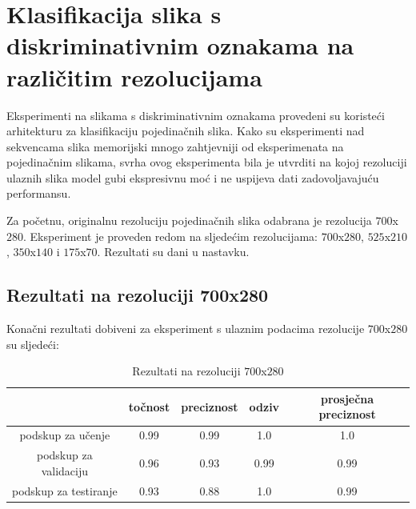 \documentclass[times, utf8, diplomski, numeric]{fer}
\begin{document}
\section{Klasifikacija slika s diskriminativnim oznakama na različitim rezolucijama}
Eksperimenti na slikama s diskriminativnim oznakama provedeni su koristeći arhitekturu za klasifikaciju pojedinačnih slika. 
Kako su eksperimenti nad sekvencama slika memorijski mnogo zahtjevniji od eksperimenata na pojedinačnim slikama, svrha ovog eksperimenta bila je utvrditi
na kojoj rezoluciji ulaznih slika model gubi ekspresivnu moć i ne uspijeva dati zadovoljavajuću performansu.

Za početnu, originalnu rezoluciju pojedinačnih slika odabrana je rezolucija $700$x$280$. Eksperiment je proveden redom na sljedećim rezolucijama:
$700$x$280$, $525$x$210$, $350$x$140$ i $175$x$70$. Rezultati su dani u nastavku.

\subsection{Rezultati na rezoluciji 700x280}
Konačni rezultati dobiveni za eksperiment s ulaznim podacima rezolucije $700$x$280$ su sljedeći:
\begin{table}[H]
\centering
\caption{Rezultati na rezoluciji $700$x$280$}
\label{score:single_hand_700x280}
\begin{tabular}{c|c|c|c|c|}
\cline{2-5}
                                            & točnost & preciznost & odziv & prosječna preciznost \\ \hline
\multicolumn{1}{|c|}{podskup za učenje}     & 0.99       & 0.99        & 1.0     &           1.0           \\ \hline
\multicolumn{1}{|c|}{podskup za validaciju} & 0.96       & 0.93        & 0.99     &            0.99          \\ \hline
\multicolumn{1}{|c|}{podskup za testiranje} & 0.93       & 0.88        & 1.0     &            0.99          \\ \hline
\end{tabular}
\end{table}
\end{document}
